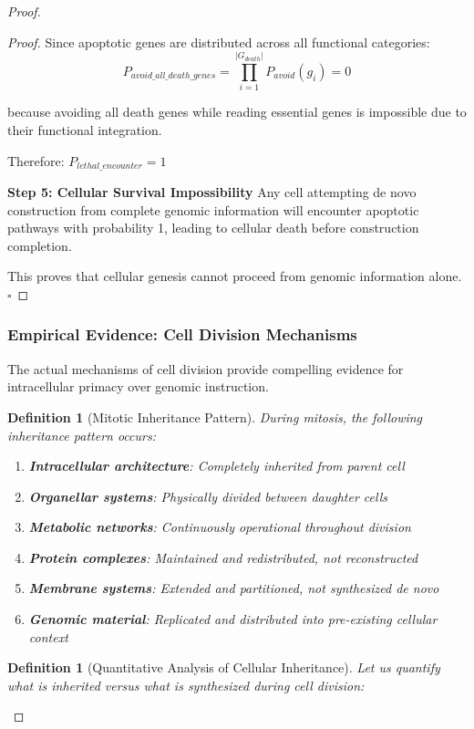 \documentclass[12pt,a4paper]{article}
\newtheorem{definition}[theorem]{Definition}
\begin{document}
\begin{proof}
\begin{proof}
Since apoptotic genes are distributed across all functional categories:
\begin{equation}
P_{avoid\_all\_death\_genes} = \prod_{i=1}^{|G_{death}|} P_{avoid}(g_i) = 0
\end{equation}

because avoiding all death genes while reading essential genes is impossible due to their functional integration.

Therefore: $P_{lethal\_encounter} = 1$

\textbf{Step 5: Cellular Survival Impossibility}
Any cell attempting de novo construction from complete genomic information will encounter apoptotic pathways with probability 1, leading to cellular death before construction completion.

This proves that cellular genesis cannot proceed from genomic information alone. $\square$
\end{proof}

\subsubsection{Empirical Evidence: Cell Division Mechanisms}

The actual mechanisms of cell division provide compelling evidence for intracellular primacy over genomic instruction.

\begin{definition}[Mitotic Inheritance Pattern]
During mitosis, the following inheritance pattern occurs:
\begin{enumerate}
\item \textbf{Intracellular architecture}: Completely inherited from parent cell
\item \textbf{Organellar systems}: Physically divided between daughter cells
\item \textbf{Metabolic networks}: Continuously operational throughout division
\item \textbf{Protein complexes}: Maintained and redistributed, not reconstructed
\item \textbf{Membrane systems}: Extended and partitioned, not synthesized de novo
\item \textbf{Genomic material}: Replicated and distributed into pre-existing cellular context
\end{enumerate}
\end{definition}

\begin{definition}[Quantitative Analysis of Cellular Inheritance]
Let us quantify what is inherited versus what is synthesized during cell division:


\end{definition}
\end{proof}
\end{document}
